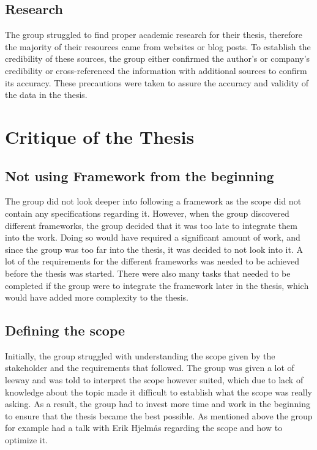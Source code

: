 \subsection{Research}
The group struggled to find proper academic research for their thesis, therefore the majority of their resources came from websites or blog posts. To establish the credibility of these sources, the group either confirmed the author's or company's credibility or cross-referenced the information with additional sources to confirm its accuracy. These precautions were taken to assure the accuracy and validity of the data in the thesis.


\section{Critique of the Thesis}

\subsection{Not using Framework from the beginning}
The group did not look deeper into following a framework as the scope did not contain any specifications regarding it. However, when the group discovered different frameworks, the group decided that it was too late to integrate them into the work. Doing so would have required a significant amount of work, and since the group was too far into the thesis, it was decided to not look into it. A lot of the requirements for the different frameworks was needed to be achieved before the thesis was started. There were also many tasks that needed to be completed if the group were to integrate the framework later in the thesis, which would have added more complexity to the thesis. 

\subsection{Defining the scope}
Initially, the group struggled with understanding the scope given by the stakeholder and the requirements that followed. The group was given a lot of leeway and was told to interpret the scope however suited, which due to lack of knowledge about the topic made it difficult to establish what the scope was really asking. As a result, the group had to invest more time and work in the beginning to ensure that the thesis became the best possible. As mentioned above the group for example had a talk with Erik Hjelmås regarding the scope and how to optimize it. 

